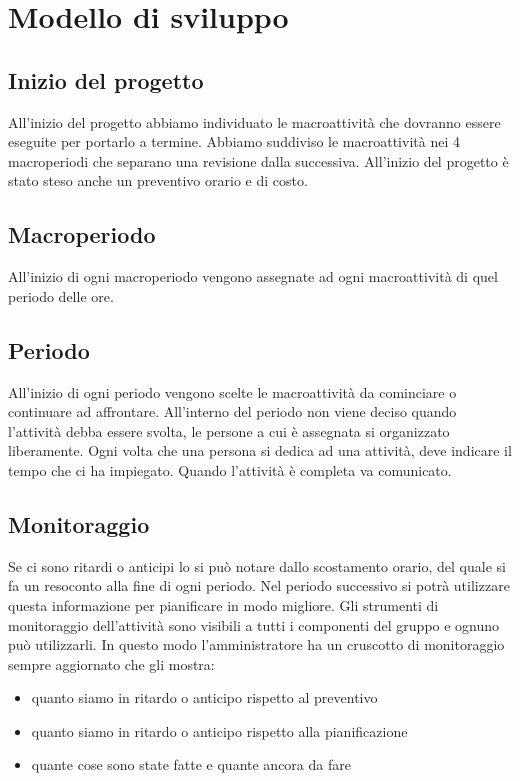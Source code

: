 \section{Modello di sviluppo}


\subsection{Inizio del progetto}
All'inizio del progetto abbiamo individuato le macroattività che dovranno essere eseguite per portarlo a termine.
Abbiamo suddiviso le macroattività nei 4 macroperiodi che separano una revisione dalla successiva.
All'inizio del progetto è stato steso anche un preventivo orario e di costo.
\subsection{Macroperiodo}
All'inizio di ogni macroperiodo vengono assegnate ad ogni macroattività di quel periodo delle ore.
\subsection{Periodo}
All'inizio di ogni periodo vengono scelte le macroattività da cominciare o continuare ad affrontare.
All'interno del periodo non viene deciso quando l'attività debba essere svolta, le persone a cui è assegnata si organizzato liberamente.
Ogni volta che una persona si dedica ad una attività, deve indicare il tempo che ci ha impiegato.
Quando l'attività è completa va comunicato.

\subsection{Monitoraggio}
Se ci sono ritardi o anticipi lo si può notare dallo scostamento orario, del quale si fa un resoconto alla fine di ogni periodo. Nel periodo successivo si potrà utilizzare questa informazione per pianificare in modo migliore.
Gli strumenti di monitoraggio dell'attività sono visibili a tutti i componenti del gruppo e ognuno può utilizzarli. In questo modo l'amministratore ha un cruscotto di monitoraggio sempre aggiornato che gli mostra:
\begin{itemize}
	\item quanto siamo in ritardo o anticipo rispetto al preventivo
	\item quanto siamo in ritardo o anticipo rispetto alla pianificazione
	\item quante cose sono state fatte e quante ancora da fare
\end{itemize}


